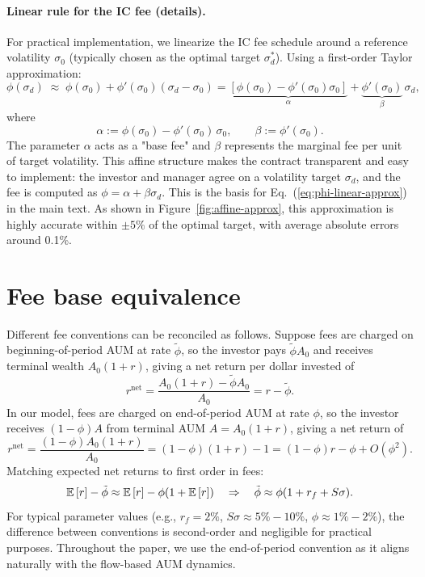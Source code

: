 \paragraph{Linear rule for the IC fee (details).}
For practical implementation, we linearize the IC fee schedule around a reference volatility $\sigma_0$ (typically chosen as the optimal target $\sigma_d^*$). Using a first-order Taylor approximation:
\begin{equation}
\phi(\sigma_d) \;\approx\; \phi(\sigma_0) + \phi'(\sigma_0)(\sigma_d - \sigma_0) = \underbrace{[\phi(\sigma_0) - \phi'(\sigma_0)\sigma_0]}_{\alpha} + \underbrace{\phi'(\sigma_0)}_{\beta}\,\sigma_d,
\end{equation}
where
\begin{equation}
\alpha := \phi(\sigma_0) - \phi'(\sigma_0)\,\sigma_0, \qquad \beta := \phi'(\sigma_0).
\end{equation}
The parameter $\alpha$ acts as a "base fee" and $\beta$ represents the marginal fee per unit of target volatility. This affine structure makes the contract transparent and easy to implement: the investor and manager agree on a volatility target $\sigma_d$, and the fee is computed as $\phi = \alpha + \beta\sigma_d$. This is the basis for Eq.~(\ref{eq:phi-linear-approx}) in the main text. As shown in Figure~\ref{fig:affine-approx}, this approximation is highly accurate within $\pm 5\%$ of the optimal target, with average absolute errors around 0.1\%.

\section{Fee base equivalence}
\label{app:fee-base}
Different fee conventions can be reconciled as follows. Suppose fees are charged on beginning-of-period AUM at rate $\tilde\phi$, so the investor pays $\tilde\phi A_0$ and receives terminal wealth $A_0(1+r)$, giving a net return per dollar invested of
\[
r^{\text{net}} = \frac{A_0(1+r) - \tilde\phi A_0}{A_0} = r - \tilde\phi.
\]
In our model, fees are charged on end-of-period AUM at rate $\phi$, so the investor receives $(1-\phi)A$ from terminal AUM $A=A_0(1+r)$, giving a net return of
\[
r^{\text{net}} = \frac{(1-\phi)A_0(1+r)}{A_0} = (1-\phi)(1+r) - 1 = (1-\phi)r - \phi + O(\phi^2).
\]
Matching expected net returns to first order in fees:
\[
{\mathbb{E}}\,[r] - \tilde\phi \approx {\mathbb{E}}\,[r] - \phi(1+{\mathbb{E}}\,[r]) \quad\Rightarrow\quad \tilde\phi \approx \phi(1+r_f + S\sigma).
\]
For typical parameter values (e.g., $r_f=2\%$, $S\sigma \approx 5\%-10\%$, $\phi \approx 1\%-2\%$), the difference between conventions is second-order and negligible for practical purposes. Throughout the paper, we use the end-of-period convention as it aligns naturally with the flow-based AUM dynamics.

